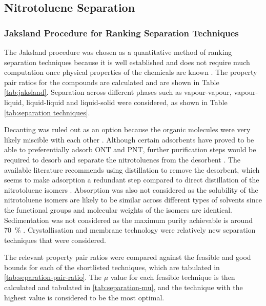 \subsection{Nitrotoluene Separation}
\label{app:ntol separation}
\subsubsection{Jaksland Procedure for Ranking Separation Techniques}
The Jaksland procedure was chosen as a quantitative method of ranking separation techniques because it is well established and does not require much computation once physical properties of the chemicals are known \cite{jaksland_separation_1995}. The property pair ratios for the compounds are calculated and are shown in Table \ref{tab:jaksland}. Separation across different phases such as vapour-vapour, vapour-liquid, liquid-liquid and liquid-solid were considered, as shown in Table \ref{tab:separation techniques}.

Decanting was ruled out as an option because the organic molecules were very likely miscible with each other \cite{merck_solvent_2021}. Although certain adsorbents have proved to be able to preferentially adsorb ONT and PNT, further purification steps would be required to desorb and separate the nitrotoluenes from the desorbent \cite{zhao_new_2016}. The available literature recommends using distillation to remove the desorbent, which seems to make adsorption a redundant step compared to direct distillation of the nitrotoluene isomers \cite{zinnen_ep0181106a2_1984}. Absorption was also not considered as the solubility of the nitrotoluene isomers are likely to be similar across different types of solvents since the functional groups and molecular weights of the isomers are identical. Sedimentation was not considered as the maximum purity achievable is around \SI{70}{\percent} \cite{seider_product_2009}. Crystallisation and membrane technology were relatively new separation techniques that were considered. 

The relevant property pair ratios were compared against the feasible and good bounds for each of the shortlisted techniques, which are tabulated in \cref{tab:separation-pair-ratio}. The $\mu$ value for each feasible technique is then calculated and tabulated in \cref{tab:separation-mu}, and the technique with the highest value is considered to be the most optimal. 

